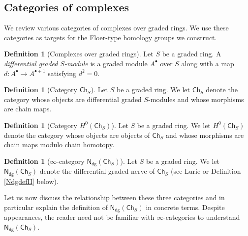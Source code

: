 \documentclass[12pt]{article}
\theoremstyle{definition}
\newtheorem{definition}[theorem]{Definition}
\theoremstyle{remark}
\numberwithin{equation}{subsection}
\newcommand{\Ch}{\mathsf{Ch}}
\newcommand{\Ndg}{\mathsf{N}_{\mathsf{dg}}}
\begin{document}
\subsection{Categories of complexes}

We review various categories of complexes over graded rings.  We use these categories as targets for the Floer-type homology groups we construct.

\begin{definition}[Complexes over graded rings]
Let $S$ be a graded ring.  A \emph{differential graded $S$-module} is a graded module $A^\bullet$ over $S$ along with a map $d:A^\bullet\to A^{\bullet+1}$ satisfying $d^2=0$.
\end{definition}

\begin{definition}[Category $\Ch_S$]\label{ChRdef}
Let $S$ be a graded ring.  We let $\Ch_S$ denote the category whose objects are differential graded $S$-modules and whose morphisms are chain maps.
\end{definition}

\begin{definition}[Category $H^0(\Ch_S)$]\label{HChRdef}
Let $S$ be a graded ring.  We let $H^0(\Ch_S)$ denote the category whose objects are objects of $\Ch_S$ and whose morphisms are chain maps modulo chain homotopy.
\end{definition}

\begin{definition}[$\infty$-category $\Ndg(\Ch_S)$]\label{Ndgdef}
Let $S$ be a graded ring.  We let $\Ndg(\Ch_S)$ denote the differential graded nerve of $\Ch_S$ (see Lurie \cite[Construction 1.3.1.6]{lurieha} or Definition \ref{NdgdefII} below).
\end{definition}

Let us now discuss the relationship between these three categories and in particular explain the definition of $\Ndg(\Ch_S)$ in concrete terms.  Despite appearances, the reader need not be familiar with $\infty$-categories to understand $\Ndg(\Ch_S)$.
\end{document}
